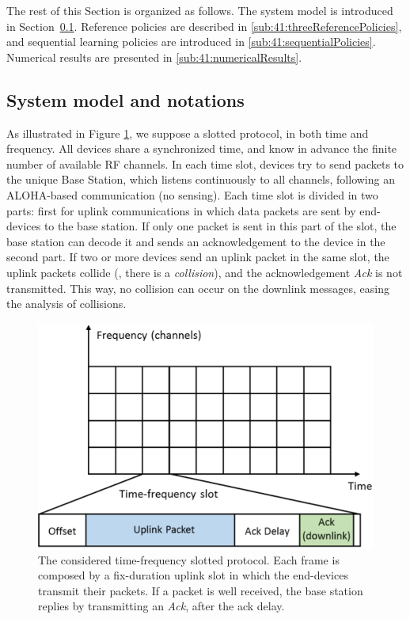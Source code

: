 The rest of this Section is organized as follows. The system model is introduced in Section~\ref{sub:41:systemModel}. Reference policies are described in \ref{sub:41:threeReferencePolicies}, and sequential learning policies are introduced in \ref{sub:41:sequentialPolicies}.
Numerical results are presented in \ref{sub:41:numericalResults}.


\subsection{System model and notations}\label{sub:41:systemModel}

As illustrated in Figure \ref{fig:41:protocol}, we suppose a slotted protocol, in both time and frequency.
All devices share a synchronized time, and know in advance the finite number of available RF channels.
In each time slot, devices try to send packets to the unique Base Station, which listens continuously to all channels, following an ALOHA-based communication (no sensing).
Each time slot is divided in two parts: first for uplink communications in which data packets are sent by end-devices to the base station. If only one packet is sent in this part of the slot, the base station can decode it and sends an acknowledgement to the device in the second part.
If two or more devices send an uplink packet in the same slot, the uplink packets collide (\ie, there is a \emph{collision}), and the acknowledgement \emph{Ack} is not transmitted.
This way, no collision can occur on the downlink messages, easing the analysis of collisions.

\begin{figure}[!t]
    \centering
    \includegraphics[scale=0.50]{2-Chapters/4-Chapter/CrownCom_17.git/protocol.eps}
    \caption{The considered time-frequency slotted protocol. Each frame is composed by a fix-duration uplink slot in which the end-devices transmit their packets. If a packet is well received, the base station replies by transmitting an \emph{Ack}, after the ack delay.}
    \label{fig:41:protocol}
\end{figure}

